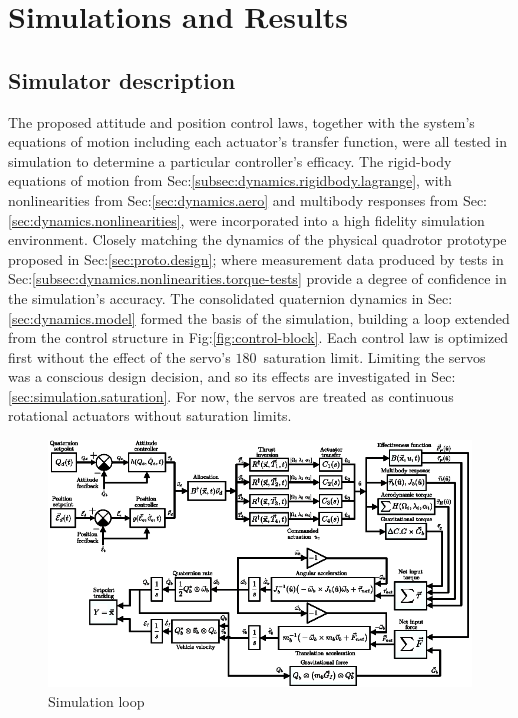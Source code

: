 \chapter{Simulations and Results}
\label{ch:simulation}
\section{Simulator description}
\label{sec:simulation.block}
The proposed attitude and position control laws, together with the system's equations of motion including each actuator's transfer function, were all tested in simulation to determine a particular controller's efficacy. The rigid-body equations of motion from Sec:\ref{subsec:dynamics.rigidbody.lagrange}, with nonlinearities from Sec:\ref{sec:dynamics.aero} and multibody responses from Sec:\ref{sec:dynamics.nonlinearities}, were incorporated into a high fidelity simulation environment. Closely matching the dynamics of the physical quadrotor prototype proposed in Sec:\ref{sec:proto.design}; where measurement data produced by tests in Sec:\ref{subsec:dynamics.nonlinearities.torque-tests} provide a degree of confidence in the simulation's accuracy. The consolidated quaternion dynamics in Sec:\ref{sec:dynamics.model} formed the basis of the simulation, building a loop extended from the control structure in Fig:\ref{fig:control-block}. Each control law is optimized first without the effect of the servo's $180$\textdegree ~saturation limit. Limiting the servos was a conscious design decision, and so its effects are investigated in Sec:\ref{sec:simulation.saturation}. For now, the servos are treated as continuous rotational actuators without saturation limits.
\par
\begin{figure}[htbp]
\centering
\includegraphics[width=\textwidth]{figs/simulation-block}
\vspace{-10pt}
\caption{Simulation loop}
\label{fig:simulation-block}
\end{figure}
